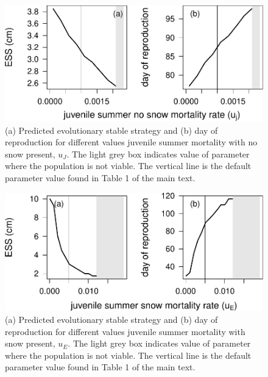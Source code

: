 \documentclass[12pt,]{article}
\begin{document}
\begin{figure}
\centering
\includegraphics{White_et_al_pika_phenology_supp_mat_files/figure-latex/unnamed-chunk-7-1.pdf}
\caption{(a) Predicted evolutionary stable strategy and (b) day of
reproduction for different values juvenile summer mortality with no snow
present, \(u_J\). The light grey box indicates value of parameter where
the population is not viable. The vertical line is the default parameter
value found in Table 1 of the main text.\label{fig:ESS_vs_u_j}}
\end{figure}

\begin{figure}
\centering
\includegraphics{White_et_al_pika_phenology_supp_mat_files/figure-latex/unnamed-chunk-8-1.pdf}
\caption{(a) Predicted evolutionary stable strategy and (b) day of
reproduction for different values juvenile summer mortality with snow
present, \(u_E\). The light grey box indicates value of parameter where
the population is not viable. The vertical line is the default parameter
value found in Table 1 of the main text.\label{fig:ESS_vs_u_E}}
\end{figure}
\end{document}

